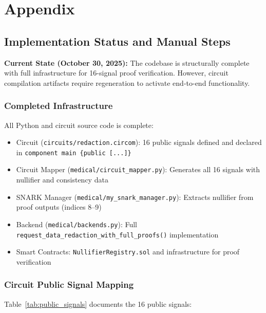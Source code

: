 \appendix

\section{Appendix}

\subsection{Implementation Status and Manual Steps}

\textbf{Current State (October 30, 2025):} The codebase is structurally complete with full infrastructure for 16-signal proof verification. However, circuit compilation artifacts require regeneration to activate end-to-end functionality.

\subsubsection{Completed Infrastructure}

All Python and circuit source code is complete:
\begin{itemize}
    \item Circuit (\texttt{circuits/redaction.circom}): 16 public signals defined and declared in \texttt{component main \{public [...]\}}
    \item Circuit Mapper (\texttt{medical/circuit\_mapper.py}): Generates all 16 signals with nullifier and consistency data
    \item SNARK Manager (\texttt{medical/my\_snark\_manager.py}): Extracts nullifier from proof outputs (indices 8--9)
    \item Backend (\texttt{medical/backends.py}): Full \texttt{request\_data\_redaction\_with\_full\_proofs()} implementation
    \item Smart Contracts: \texttt{NullifierRegistry.sol} and infrastructure for proof verification
\end{itemize}

\subsubsection{Circuit Public Signal Mapping}

Table~\ref{tab:public_signals} documents the 16 public signals:

